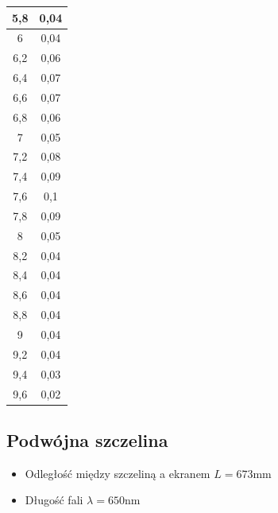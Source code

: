 \documentclass{fizykalab}
\begin{document}
\begin{table}
\begin{tabular}{|c|c|}
        5,8 & 0,04 \\ \hline
        6 & 0,04 \\ \hline
        6,2 & 0,06 \\ \hline
        6,4 & 0,07 \\ \hline
        6,6 & 0,07 \\ \hline
        6,8 & 0,06 \\ \hline
        7 & 0,05 \\ \hline
        7,2 & 0,08 \\ \hline
        7,4 & 0,09 \\ \hline
        7,6 & 0,1 \\ \hline
        7,8 & 0,09 \\ \hline
        8 & 0,05 \\ \hline
        8,2 & 0,04 \\ \hline
        8,4 & 0,04 \\ \hline
        8,6 & 0,04 \\ \hline
        8,8 & 0,04 \\ \hline
        9 & 0,04 \\ \hline
        9,2 & 0,04 \\ \hline
        9,4 & 0,03 \\ \hline
        9,6 & 0,02 \\ \hline
    \end{tabular}
\end{table}

\subsection{Podwójna szczelina}

\begin{itemize}
    \item Odległość między szczeliną a ekranem $L = 673 \text{mm}$
    \item Długość fali $\lambda = 650 \text{nm}$
\end{itemize}
\end{document}
